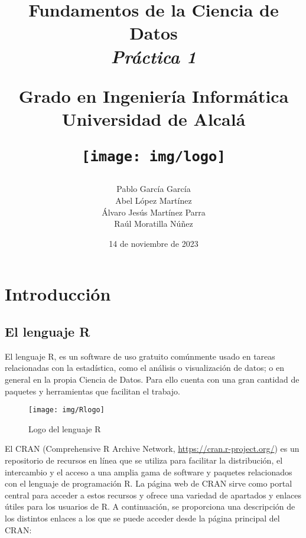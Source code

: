\documentclass[12pt]{report}\usepackage[]{graphicx}\usepackage[dvipsnames]{xcolor}
\title{
	\huge
	\noindent\textbf{Fundamentos de la Ciencia de Datos}\\
	
	{\Large \textit{Práctica 1}}
	\vspace{1cm}
	
	\huge
	Grado en Ingeniería Informática\\
	Universidad de Alcalá\\
	
	\vspace{1cm}
	
	\texttt{[image: img/logo]}
}
\author{
	Pablo García García\\
	Abel López Martínez\\
	Álvaro Jesús Martínez Parra\\
	Raúl Moratilla Núñez
}
\date{
	\large{14 de noviembre de 2023}
}
\begin{document}
	
	\renewcommand{\chaptername}{Parte}
	\renewcommand{\lstlistingname}{Código}
	\maketitle \thispagestyle{empty}
	
	\newpage
	
	\setcounter{tocdepth}{3}
	\tableofcontents
	\listoffigures
	
	\chapter*{Introducción}\pagestyle{plain}
	
		\section*{El lenguaje R}
		
			El lenguaje R, es un software de uso gratuito comúnmente usado en tareas relacionadas con la estadística, como el análisis o visualización de datos; o en general en la propia Ciencia de Datos. Para ello cuenta con una gran cantidad de paquetes y herramientas que facilitan el trabajo.   
			
			\begin{figure}[H]
				\centering
				\texttt{[image: img/Rlogo]}
				\caption{Logo del lenguaje R}
				\label{fig:logo_R}
			\end{figure}
		
			El CRAN (Comprehensive R Archive Network, \url{https://cran.r-project.org/}) es un repositorio de recursos en línea que se utiliza para facilitar la distribución, el intercambio y el acceso a una amplia gama de software y paquetes relacionados con el lenguaje de programación R. La página web de CRAN sirve como portal central para acceder a estos recursos y ofrece una variedad de apartados y enlaces útiles para los usuarios de R. A continuación, se proporciona una descripción de los distintos enlaces a los que se puede acceder desde la página principal del CRAN:
			
\end{document}
